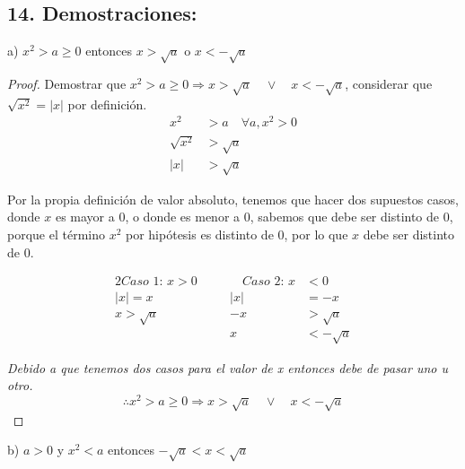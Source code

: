 \documentclass{article}
\begin{document}
\newpage
\subsection*{14. Demostraciones:}

a) \quad \(x^2>a\geq 0\) entonces \(x>\sqrt{a}\) o \(x<-\sqrt{a}\)
  \begin{proof}
Demostrar que \(x^2 > a \geq 0 \Rightarrow x > \sqrt{a} \quad \lor \quad x < -\sqrt{a}\), considerar que \(\sqrt{x^2} = |x|\) por definición.\\
\begin{align*}
    x^2 &> a \quad \forall a,x^2 > 0 \\
    \sqrt{x^2} &> \sqrt{a} \\
    |x| &> \sqrt{a}
\end{align*}

Por la propia definición de valor absoluto, tenemos que hacer dos supuestos casos, donde \(x\) es mayor a 0, o donde es menor a 0, sabemos que debe ser distinto de 0, porque el término \(x^2\) por hipótesis es distinto de 0, por lo que \(x\) debe ser distinto de 0.

\begin{alignat*}{2}
\textit{Caso 1:    } x>0 \quad && \quad \textit{Caso 2:    } x&<0 \\
|x| = x && |x| &= -x \\
x > \sqrt{a} && -x &> \sqrt{a} \\
&& x &< -\sqrt{a}
\end{alignat*}

\textit{Debido a que tenemos dos casos para el valor de x entonces debe de pasar uno u otro.}\\
\[\therefore x^2 > a \geq 0 \Rightarrow x > \sqrt{a} \quad \lor \quad x < -\sqrt{a}\]

  \end{proof}
  b) \quad \(a>0\) y \(x^2<a\) entonces \(-\sqrt{a}<x<\sqrt{a}\)
\end{document}
